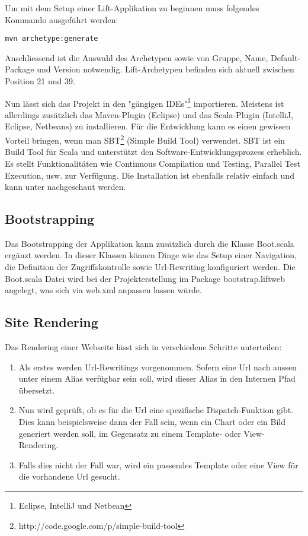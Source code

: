 Um mit dem Setup einer Lift-Applikation zu beginnen muss folgendes Kommando ausgef\"uhrt werden: \begin{lstlisting}[caption=Erstellung eines Lift-Projektes]
mvn archetype:generate
\end{lstlisting}
Anschliessend ist die Auswahl des Archetypen sowie von Gruppe, Name, Default-Package und Version notwendig. Lift-Archetypen befinden sich aktuell zwischen Position 21 und 39. 

Nun l\"asst sich das Projekt in den "g\"angigen IDEs"\footnote{Eclipse, IntelliJ und Netbean} importieren. Meistens ist allerdings zus\"atzlich das Maven-Plugin (Eclipse) und das Scala-Plugin (IntelliJ, Eclipse, Netbeans) zu installieren. F\"ur die Entwicklung kann es einen gewissen Vorteil bringen, wenn man SBT\footnote{http://code.google.com/p/simple-build-tool} (Simple Build Tool) verwendet. SBT ist ein Build Tool f\"ur Scala und unterst\"utzt den Software-Entwicklungsprozess erheblich. Es stellt Funktionalit\"aten wie Continuous Compilation und Testing, Parallel Test Execution, usw. zur Verf\"ugung. Die Installation ist ebenfalls relativ einfach und kann unter \cite{liftweb:using-sbt} nachgeschaut werden.

\subsection{Bootstrapping \cite[p. 26]{chen2009lift}}
Das Bootstrapping der Applikation kann zus\"atzlich durch die Klasse Boot.scala erg\"anzt werden. In dieser Klassen k\"onnen Dinge wie das Setup einer Navigation, die Definition der Zugriffskontrolle sowie Url-Rewriting konfiguriert werden. Die Boot.scala Datei wird bei der Projekterstellung im Package bootstrap.liftweb angelegt, was sich via web.xml anpassen lassen w\"urde.

\subsection{Site Rendering \cite[p. 27-43]{chen2009lift}}
Das Rendering einer Webseite l\"asst sich in verschiedene Schritte unterteilen:

\begin{enumerate}
	\item Als erstes werden Url-Rewritings vorgenommen. Sofern eine Url nach aussen unter einem Alias verf\"ugbar sein soll, wird dieser Alias in den Internen Pfad \"ubersetzt.
	\item Nun wird gepr\"uft, ob es f\"ur die Url eine spezifische Dispatch-Funktion gibt. Dies kann beispielsweise dann der Fall sein, wenn ein Chart oder ein Bild generiert werden soll, im Gegensatz zu einem Template- oder View-Rendering. 
	\item Falls dies nicht der Fall war, wird ein passendes Template oder eine View f\"ur die vorhandene Url gesucht.
\end{enumerate}


